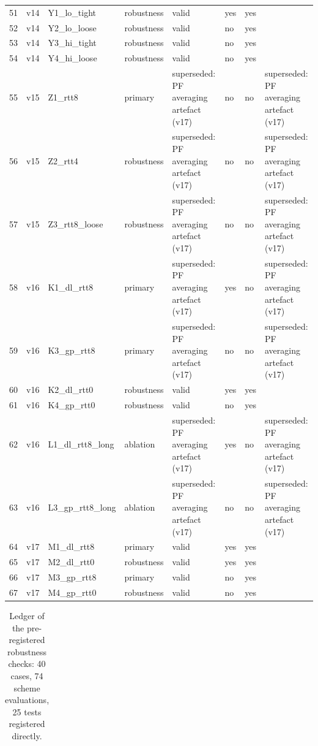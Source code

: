 \documentclass[10pt]{article}
\begin{document}
\begin{landscape}
\begin{longtable}{@{}llllllll@{}}
51 & v14 & Y1\_lo\_tight & robustness & valid & yes & yes &  \\
52 & v14 & Y2\_lo\_loose & robustness & valid & no & yes &  \\
53 & v14 & Y3\_hi\_tight & robustness & valid & no & yes &  \\
54 & v14 & Y4\_hi\_loose & robustness & valid & no & yes &  \\
55 & v15 & Z1\_rtt8 & primary & superseded: PF averaging artefact (v17) & no & no & superseded: PF averaging artefact (v17) \\
56 & v15 & Z2\_rtt4 & robustness & superseded: PF averaging artefact (v17) & no & no & superseded: PF averaging artefact (v17) \\
57 & v15 & Z3\_rtt8\_loose & robustness & superseded: PF averaging artefact (v17) & no & no & superseded: PF averaging artefact (v17) \\
58 & v16 & K1\_dl\_rtt8 & primary & superseded: PF averaging artefact (v17) & yes & no & superseded: PF averaging artefact (v17) \\
59 & v16 & K3\_gp\_rtt8 & primary & superseded: PF averaging artefact (v17) & no & no & superseded: PF averaging artefact (v17) \\
60 & v16 & K2\_dl\_rtt0 & robustness & valid & yes & yes &  \\
61 & v16 & K4\_gp\_rtt0 & robustness & valid & no & yes &  \\
62 & v16 & L1\_dl\_rtt8\_long & ablation & superseded: PF averaging artefact (v17) & yes & no & superseded: PF averaging artefact (v17) \\
63 & v16 & L3\_gp\_rtt8\_long & ablation & superseded: PF averaging artefact (v17) & no & no & superseded: PF averaging artefact (v17) \\
64 & v17 & M1\_dl\_rtt8 & primary & valid & yes & yes &  \\
65 & v17 & M2\_dl\_rtt0 & robustness & valid & yes & yes &  \\
66 & v17 & M3\_gp\_rtt8 & primary & valid & no & yes &  \\
67 & v17 & M4\_gp\_rtt0 & robustness & valid & no & yes &  \\
\bottomrule
\end{longtable}
\normalsize
\scriptsize
\setlength{\tabcolsep}{3pt}
\begin{longtable}{@{}llllll@{}}
\caption{Ledger of the pre-registered robustness checks: 40 cases, 74 scheme evaluations, 25 tests registered directly.}\\
\toprule

\end{longtable}
\end{landscape}
\end{document}
